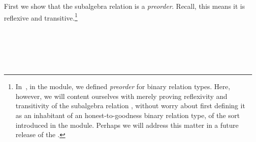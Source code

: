First we show that the subalgebra relation is a \emph{preorder}. Recall, this
means it is reflexive and transitive.\footnote{In~\cite{DeMeo:2021-1}, in the  module, we defined \emph{preorder} for binary relation types. Here, however, we will content ourselves with merely proving reflexivity and transitivity of the subalgebra relation , without worry about first defining it as an inhabitant of an honest-to-goodness binary relation type, of the sort introduced in the  module. Perhaps we will address this matter in a future release of the \ualib.}
\ccpad
\begin{code}%
\>[0]\AgdaSpace{}%
\AgdaSymbol{:}\AgdaSpace{}%
\AgdaSymbol{\{}\AgdaSpace{}%
\AgdaSymbol{:}\AgdaSpace{}%
\AgdaSymbol{\}(}\AgdaSpace{}%
\AgdaSymbol{:}\AgdaSpace{}%
\AgdaSpace{}%
\AgdaSpace{}%
\AgdaSymbol{)}\AgdaSpace{}%
\AgdaSpace{}%
\AgdaSpace{}%
\AgdaSpace{}%
\<%
\\
\>[0]\AgdaSpace{}%
\AgdaSpace{}%
\AgdaSymbol{=}\AgdaSpace{}%
\AgdaSymbol{(}\AgdaSpace{}%
\AgdaSpace{}%
\AgdaSpace{}%
\AgdaSpace{}%
\AgdaOperator{\AgdaInductiveConstructor{,}}\AgdaSpace{}%
\AgdaSymbol{)}\AgdaSpace{}%
\AgdaOperator{\AgdaInductiveConstructor{,}}\AgdaSpace{}%
\<%
\\
%
\\[\AgdaEmptyExtraSkip]%
\>[0]\AgdaSpace{}%
\AgdaSymbol{:}\AgdaSpace{}%
\AgdaSymbol{\{}\AgdaSpace{}%
\AgdaSymbol{:}\AgdaSpace{}%
\AgdaSymbol{\}\{}\AgdaSpace{}%
\AgdaSymbol{:}\AgdaSpace{}%
\AgdaSpace{}%
\AgdaSpace{}%
\AgdaSymbol{\}}\AgdaSpace{}%
\AgdaSpace{}%
\AgdaSpace{}%
\AgdaSpace{}%
\<%
\\
\>[0]\AgdaSpace{}%
\AgdaSymbol{\{}\AgdaSymbol{\}\{}\AgdaSymbol{\}}\AgdaSpace{}%
\AgdaSymbol{=}\AgdaSpace{}%
\AgdaSpace{}%
\<%
\end{code}
\scpad
